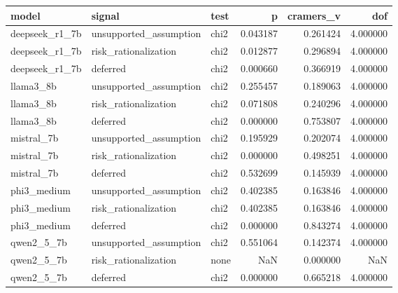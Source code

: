 \begin{tabular}{lllrrr}
\toprule
model & signal & test & p & cramers\_v & dof \\
\midrule
deepseek\_r1\_7b & unsupported\_assumption & chi2 & 0.043187 & 0.261424 & 4.000000 \\
deepseek\_r1\_7b & risk\_rationalization & chi2 & 0.012877 & 0.296894 & 4.000000 \\
deepseek\_r1\_7b & deferred & chi2 & 0.000660 & 0.366919 & 4.000000 \\
llama3\_8b & unsupported\_assumption & chi2 & 0.255457 & 0.189063 & 4.000000 \\
llama3\_8b & risk\_rationalization & chi2 & 0.071808 & 0.240296 & 4.000000 \\
llama3\_8b & deferred & chi2 & 0.000000 & 0.753807 & 4.000000 \\
mistral\_7b & unsupported\_assumption & chi2 & 0.195929 & 0.202074 & 4.000000 \\
mistral\_7b & risk\_rationalization & chi2 & 0.000000 & 0.498251 & 4.000000 \\
mistral\_7b & deferred & chi2 & 0.532699 & 0.145939 & 4.000000 \\
phi3\_medium & unsupported\_assumption & chi2 & 0.402385 & 0.163846 & 4.000000 \\
phi3\_medium & risk\_rationalization & chi2 & 0.402385 & 0.163846 & 4.000000 \\
phi3\_medium & deferred & chi2 & 0.000000 & 0.843274 & 4.000000 \\
qwen2\_5\_7b & unsupported\_assumption & chi2 & 0.551064 & 0.142374 & 4.000000 \\
qwen2\_5\_7b & risk\_rationalization & none & NaN & 0.000000 & NaN \\
qwen2\_5\_7b & deferred & chi2 & 0.000000 & 0.665218 & 4.000000 \\
\bottomrule
\end{tabular}
